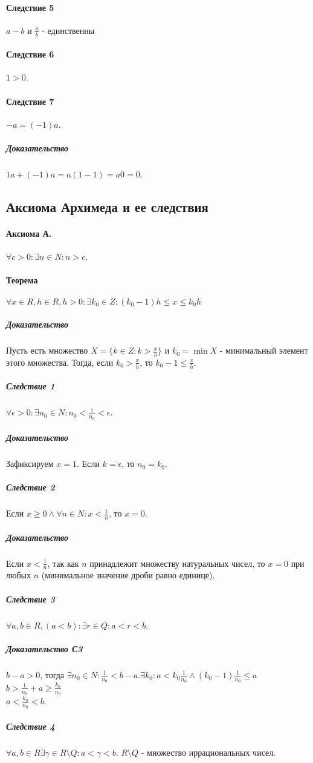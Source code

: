 \documentclass[10pt]{article}
\begin{document}
			\paragraph{Следствие 5} $a-b$ и $\frac{a}{b}$ - единственны
			\paragraph{Следствие 6} $1 > 0$.
			\paragraph{Следствие 7} $-a = (-1)a$.
			\subparagraph{Доказательство} $1a + (-1)a = a(1-1) = a0 = 0$. 
		\subsection{Аксиома Архимеда и ее следствия}
			\paragraph{Аксиома А.} 	$\forall c > 0 : \exists n \in N : n > c$.
			\paragraph{Теорема} $\forall x \in R, h \in R, h > 0 : \exists k_0 \in Z : (k_0-1)h \le x \le k_0h$
			\subparagraph{Доказательство} Пусть есть множество $X = \{k \in Z : k > \frac{x}{h}\}$ и $k_0 = \min X$ - минимальный элемент этого множества. Тогда, если $k_0 > \frac{x}{h}$, то $k_0 - 1 \le \frac{x}{h}$.
			\subparagraph{Следствие 1} $\forall \epsilon > 0 : \exists n_0 \in N : n_0 < \frac{1}{n_0} < \epsilon$.
			\subparagraph{Доказательство}
				Зафиксируем $x = 1$. Если $k = \epsilon$, то $n_0 = k_0$.
			\subparagraph{Следствие 2} Если $x \geq 0 \wedge \forall n \in N : x < \frac{1}{n}$, то $x = 0$.
			\subparagraph{Доказательство}
				Если $x < \frac{1}{n}$, так как $n$ принадлежит множеству натуральных чисел, то $x = 0$ при любых $n$ (минимальное значение дроби равно единице).
			\subparagraph{Следствие 3} $\forall a, b \in R, (a < b) : \exists r \in Q : a < r < b$.
			\subparagraph{Доказательство С3} $b-a>0$, тогда $\exists n_0 \in N : \frac{1}{n_0} < b-a. \exists k_0 : a < k_0\frac{1}{n_0} \wedge (k_0 - 1)\frac{1}{n_0} \le a$\\
			$b > \frac{1}{n_0} + a \geq \frac{k_0}{n_0}$\\
			$a < \frac{k_0}{n_0} < b$.
			\subparagraph{Следствие 4} $\forall a,b \in R \exists \gamma \in R\setminus Q : a < \gamma < b$. $R\setminus Q$ - множество иррациональных чисел.
\end{document}
